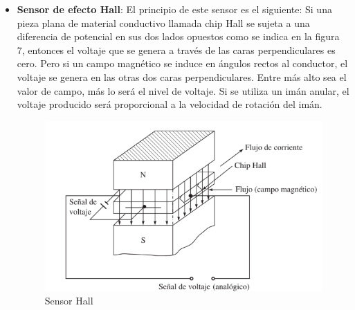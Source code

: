 \documentclass{article}
\begin{document}
\begin{itemize}
		
		\item \textbf{Sensor de efecto Hall}: El  principio de este sensor es el siguiente: Si una pieza plana de material conductivo llamada chip Hall se sujeta a una diferencia de potencial en sus dos lados opuestos como se indica en la figura 7, entonces el voltaje que se genera a través de las caras perpendiculares es cero. Pero si un campo magnético se induce en ángulos rectos al conductor, el voltaje se genera en las otras dos caras perpendiculares. Entre más alto sea el valor de campo, más lo será el nivel de voltaje. Si se utiliza un imán anular, el voltaje producido será proporcional a la velocidad de rotación del imán. 
		\begin{figure}[H]
		\centering
		\includegraphics[width=\textwidth]{sensorhall.png}
		\caption{Sensor Hall}
	    \end{figure}
	    
	\end{itemize}
	
\end{document}
